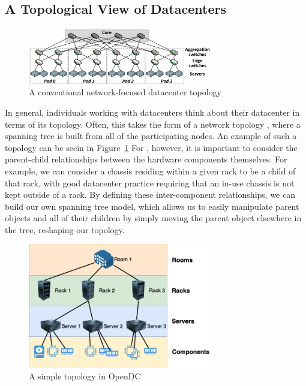 \documentclass[11pt]{article}
\begin{document}
	\subsection{A Topological View of Datacenters}
		\begin{figure}[]
			\centering
			\includegraphics[width=8cm]{couto2012/Fat-tree-with-4-port-switches-n-4.png}
			\caption[A conventional network-focused datacenter topology]{A conventional network-focused datacenter topology \cite{Couto2012}}
			\label{fig:networktopology}
		\end{figure}
		In general, individuals working with datacenters think about their datacenter in terms of its topology. 
		Often, this takes the form of a network topology \cite{Couto2012}, where a spanning tree is built from all of the participating nodes.
		An example of such a topology can be seein in Figure~\ref{fig:networktopology} 
		For \opendc{}, however, it is important to consider the parent-child relationships between the hardware components themselves. 
		For example, we can consider a chassis residing within a given rack to be a child of that rack, with good datacenter practice requiring that an in-use chassis is not kept outside of a rack.
		By defining these inter-component relationships, we can build our own spanning tree model, which allows us to easily manipulate parent objects and all of their children by simply moving the parent object elsewhere in the tree, reshaping our topology.
		\begin{figure}[]
			\centering
			\includegraphics[width=8cm]{opendc-topology.png}
			\caption[A simple topology in OpenDC]{A simple topology in OpenDC}
			\label{fig:example-opendc-topology}
		\end{figure}
	
\end{document}
